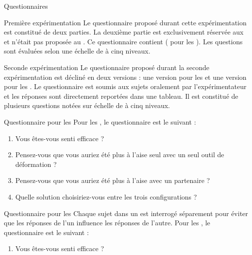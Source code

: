 \documentclass[myfrancais,ngerman,english,french]{mythesis}
\begin{document}
	\begin{mychapter}{Questionnaires}
		\begin{mysection}{Première expérimentation}
			Le questionnaire proposé durant cette expérimentation est constitué de deux parties.
			La deuxième partie est exclusivement réservée aux  et n'était pas proposée au .
			Ce questionnaire contient  ( pour les ).
			Les questions sont évaluées selon une échelle de  à cinq niveaux.
		\end{mysection}
		\begin{mysection}{Seconde expérimentation}
			Le questionnaire proposé durant la seconde expérimentation est décliné en deux versions : une version pour les  et une version pour les .
			Le questionnaire est soumis aux sujets oralement par l'expérimentateur et les réponses sont directement reportées dans une tableau.
			Il est constitué de plusieurs questions notées sur échelle de  à cinq niveaux.
			\begin{mysubsection}{Questionnaire pour les }
				Pour les , le questionnaire est le suivant :
				\begin{enumerate}
					\item Vous êtes-vous senti efficace ?
					\item Pensez-vous que vous auriez été plus à l'aise seul avec un seul outil de déformation ?
					\item Pensez-vous que vous auriez été plus à l'aise avec un partenaire ?
					\item Quelle solution choisiriez-vous entre les trois configurations ?
				\end{enumerate}
			\end{mysubsection}
			\begin{mysubsection}{Questionnaire pour les }
				Chaque sujet dans un  est interrogé séparement pour éviter que les réponses de l'un influence les réponses de l'autre.
				Pour les , le questionnaire est le suivant :
				\begin{enumerate}
					\item Vous êtes-vous senti efficace ?

\end{enumerate}
\end{mysubsection}
\end{mysection}
\end{mychapter}
\end{document}
